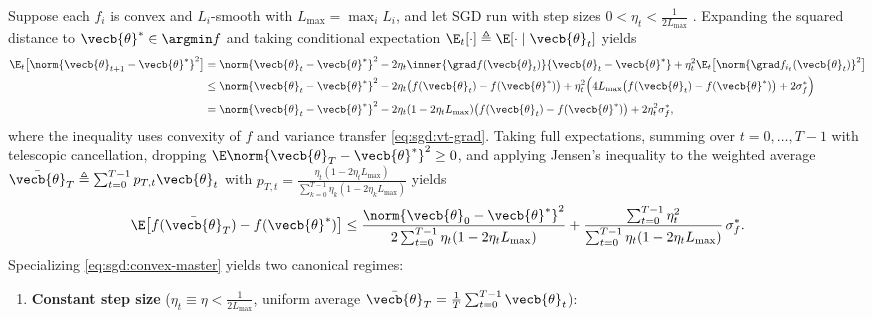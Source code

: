 \documentclass[../../../../master.tex]{subfiles}
\begin{document}
\begin{coremath}
Suppose each $f_i$ is convex and $L_i$-smooth with $L_{\max} = \max_i L_i$, and let SGD run with step sizes $0 < \eta_t < \frac{1}{2L_{\max}}$ . Expanding the squared distance to $\vecb{\theta}^* \in \argmin f$ and taking conditional expectation $\E_t[\cdot] \triangleq \E[\cdot \mid \vecb{\theta}_t]$ yields
\begin{align}
\E_t\bigl[\norm{\vecb{\theta}_{t+1} - \vecb{\theta}^*}^2\bigr]
&= \norm{\vecb{\theta}_t - \vecb{\theta}^*}^2 - 2\eta_t\inner{\grad f(\vecb{\theta}_t)}{\vecb{\theta}_t - \vecb{\theta}^*} + \eta_t^2 \E_t\bigl[\norm{\grad f_{i_t}(\vecb{\theta}_t)}^2\bigr] \nonumber \\
&\le \norm{\vecb{\theta}_t - \vecb{\theta}^*}^2 - 2\eta_t\bigl(f(\vecb{\theta}_t) - f(\vecb{\theta}^*)\bigr) + \eta_t^2\Bigl(4L_{\max}\bigl(f(\vecb{\theta}_t) - f(\vecb{\theta}^*)\bigr) + 2\sigma_f^*\Bigr) \nonumber \\
&= \norm{\vecb{\theta}_t - \vecb{\theta}^*}^2 - 2\eta_t(1 - 2\eta_t L_{\max})\bigl(f(\vecb{\theta}_t) - f(\vecb{\theta}^*)\bigr) + 2\eta_t^2 \sigma_f^*, \label{eq:sgd:convex-step}
\end{align}
where the inequality uses convexity of $f$ and variance transfer \eqref{eq:sgd:vt-grad}. Taking full expectations, summing over $t = 0,\dots,T-1$ with telescopic cancellation, dropping $\E\norm{\vecb{\theta}_T - \vecb{\theta}^*}^2 \ge 0$, and applying Jensen's inequality to the weighted average $\bar{\vecb{\theta}}_T \triangleq \sum_{t=0}^{T-1} p_{T,t}\vecb{\theta}_t$ with $p_{T,t} = \frac{\eta_t(1 - 2\eta_t L_{\max})}{\sum_{k=0}^{T-1}\eta_k(1 - 2\eta_k L_{\max})}$ yields
\begin{equation}
\label{eq:sgd:convex-master}
\E\bigl[f(\bar{\vecb{\theta}}_T) - f(\vecb{\theta}^*)\bigr]
\le \frac{\norm{\vecb{\theta}_0 - \vecb{\theta}^*}^2}{2\sum_{t=0}^{T-1}\eta_t(1 - 2\eta_t L_{\max})} + \frac{\sum_{t=0}^{T-1}\eta_t^2}{\sum_{t=0}^{T-1}\eta_t(1 - 2\eta_t L_{\max})}\,\sigma_f^*.
\end{equation}
Specializing \eqref{eq:sgd:convex-master} yields two canonical regimes:
\begin{enumerate}
  \item \textbf{Constant step size} ($\eta_t \equiv \eta < \frac{1}{2L_{\max}}$, uniform average $\bar{\vecb{\theta}}_T = \frac{1}{T}\sum_{t=0}^{T-1}\vecb{\theta}_t$):
  \begin{equation}

\end{equation}
\end{enumerate}
\end{coremath}
\end{document}
